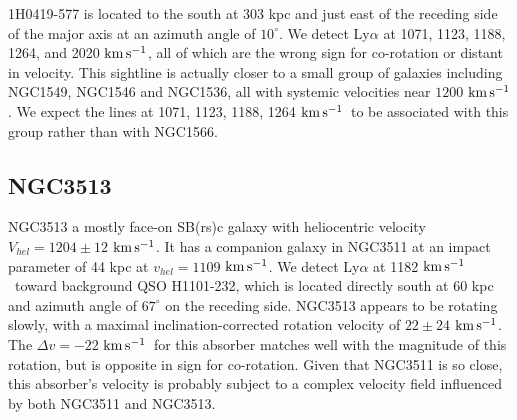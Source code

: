 \documentclass[iop]{emulateapj-rtx4}
\newcommand{\kms}{$\rm km\, s^{-1}$}
\begin{document}
1H0419-577 is located to the south at 303 kpc and just east of the receding side of the major axis at an azimuth angle of $10^{\circ}$. We detect Ly$\alpha$ at 1071, 1123, 1188, 1264, and 2020 \kms, all of which are the wrong sign for co-rotation or distant in velocity. This sightline is actually closer to a small group of galaxies including NGC1549, NGC1546 and NGC1536, all with systemic velocities near $1200$ \kms. We expect the lines at 1071, 1123, 1188, 1264 \kms~to be associated with this group rather than with NGC1566.


%
%
%
%
%




\subsection{NGC3513}
NGC3513 a mostly face-on SB(rs)c galaxy with heliocentric velocity $V_{hel} = 1204 \pm 12$ \kms. It has a companion galaxy in NGC3511 at an impact parameter of 44 kpc at $v_{hel} = 1109$ \kms. We detect Ly$\alpha$ at 1182 \kms~toward background QSO H1101-232, which is located directly south at 60 kpc and azimuth angle of $67^{\circ}$ on the receding side. NGC3513 appears to be rotating slowly, with a maximal inclination-corrected rotation velocity of $22 \pm 24$ \kms. The $\Delta v = -22$ \kms~for this absorber matches well with the magnitude of this rotation, but is opposite in sign for co-rotation. Given that NGC3511 is so close, this absorber's velocity is probably subject to a complex velocity field influenced by both NGC3511 and NGC3513.
\end{document}
